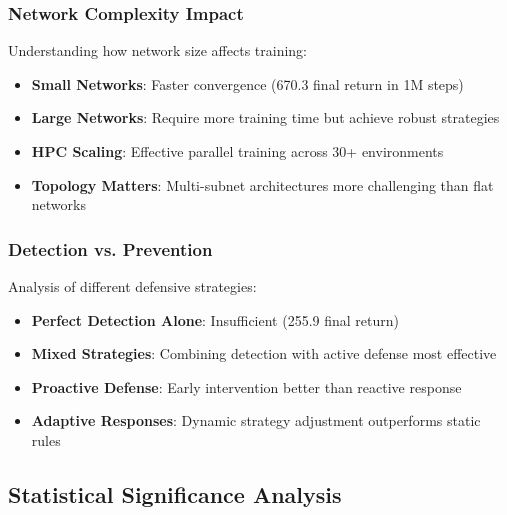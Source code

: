 \documentclass[12pt,a4paper]{article}
\begin{document}
\subsubsection{Network Complexity Impact}
Understanding how network size affects training:

\begin{itemize}
    \item \textbf{Small Networks}: Faster convergence (670.3 final return in 1M steps)
    \item \textbf{Large Networks}: Require more training time but achieve robust strategies
    \item \textbf{HPC Scaling}: Effective parallel training across 30+ environments
    \item \textbf{Topology Matters}: Multi-subnet architectures more challenging than flat networks
\end{itemize}

\subsubsection{Detection vs. Prevention}
Analysis of different defensive strategies:

\begin{itemize}
    \item \textbf{Perfect Detection Alone}: Insufficient (255.9 final return)
    \item \textbf{Mixed Strategies}: Combining detection with active defense most effective
    \item \textbf{Proactive Defense}: Early intervention better than reactive response
    \item \textbf{Adaptive Responses}: Dynamic strategy adjustment outperforms static rules
\end{itemize}

\subsection{Statistical Significance Analysis}
\end{document}
